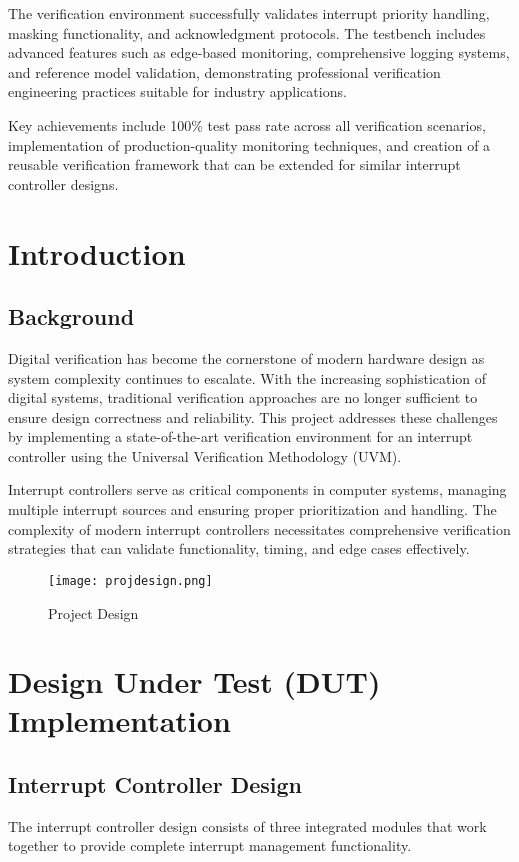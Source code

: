 \documentclass[12pt,a4paper]{article}
\begin{document}
The verification environment successfully validates interrupt priority handling, masking functionality, and acknowledgment protocols. The testbench includes advanced features such as edge-based monitoring, comprehensive logging systems, and reference model validation, demonstrating professional verification engineering practices suitable for industry applications.

Key achievements include 100\% test pass rate across all verification scenarios, implementation of production-quality monitoring techniques, and creation of a reusable verification framework that can be extended for similar interrupt controller designs.

\section{Introduction}
\subsection{Background}
Digital verification has become the cornerstone of modern hardware design as system complexity continues to escalate. With the increasing sophistication of digital systems, traditional verification approaches are no longer sufficient to ensure design correctness and reliability. This project addresses these challenges by implementing a state-of-the-art verification environment for an interrupt controller using the Universal Verification Methodology (UVM).

Interrupt controllers serve as critical components in computer systems, managing multiple interrupt sources and ensuring proper prioritization and handling. The complexity of modern interrupt controllers necessitates comprehensive verification strategies that can validate functionality, timing, and edge cases effectively.
\begin{figure}[h]
    \centering
    \texttt{[image: projdesign.png]}
    \caption{Project Design}
    \label{fig:placeholder}
\end{figure}


\section{Design Under Test (DUT) Implementation}
\subsection{Interrupt Controller Design}
The interrupt controller design consists of three integrated modules that work together to provide complete interrupt management functionality.
\end{document}
